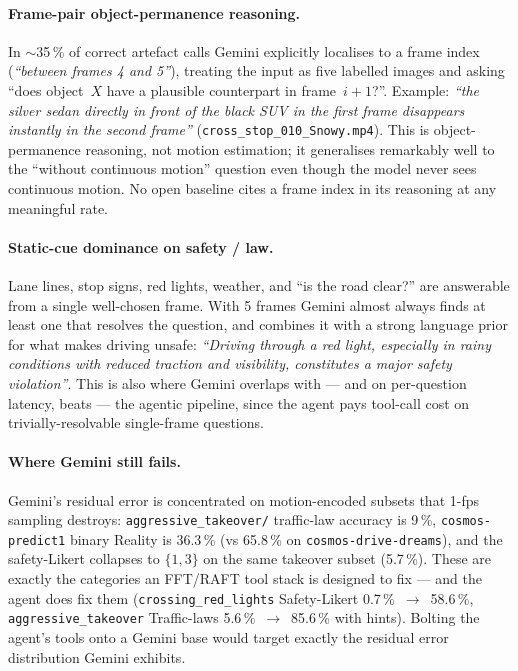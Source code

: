 \documentclass[11pt,a4paper]{article}
\newcommand{\pct}[1]{#1\,\%}
\newcommand{\code}[1]{\texttt{#1}}
\begin{document}
\paragraph{Frame-pair object-permanence reasoning.} In $\sim$\pct{35} of
correct artefact calls Gemini explicitly localises to a frame index
(\emph{``between frames 4 and 5''}), treating the input as five
labelled images and asking ``does object~$X$ have a plausible
counterpart in frame~$i+1$?''. Example: \emph{``the silver sedan
directly in front of the black SUV in the first frame disappears
instantly in the second frame''}
(\code{cross\_stop\_010\_Snowy.mp4}). This is object-permanence
reasoning, not motion estimation; it generalises remarkably well to the
``without continuous motion'' question even though the model never
sees continuous motion. No open baseline cites a frame index in its
reasoning at any meaningful rate.

\paragraph{Static-cue dominance on safety / law.} Lane lines, stop signs,
red lights, weather, and ``is the road clear?'' are answerable from a
single well-chosen frame. With 5 frames Gemini almost always finds at
least one that resolves the question, and combines it with a strong
language prior for what makes driving unsafe: \emph{``Driving through
a red light, especially in rainy conditions with reduced traction and
visibility, constitutes a major safety violation''}. This is also where
Gemini overlaps with --- and on per-question latency, beats --- the
agentic pipeline, since the agent pays tool-call cost on
trivially-resolvable single-frame questions.

\paragraph{Where Gemini still fails.} Gemini's residual error is
concentrated on motion-encoded subsets that 1-fps sampling destroys:
\code{aggressive\_takeover/} traffic-law accuracy is \pct{9},
\code{cosmos-predict1} binary Reality is \pct{36.3} (vs \pct{65.8} on
\code{cosmos-drive-dreams}), and the safety-Likert collapses to
$\{1,3\}$ on the same takeover subset (\pct{5.7}). These are exactly the
categories an FFT/RAFT tool stack is designed to fix --- and the agent
does fix them (\code{crossing\_red\_lights} Safety-Likert
\pct{0.7}~$\to$~\pct{58.6}, \code{aggressive\_takeover}
Traffic-laws \pct{5.6}~$\to$~\pct{85.6} with hints). Bolting the
agent's tools onto a Gemini base would target exactly the residual
error distribution Gemini exhibits.
\end{document}
